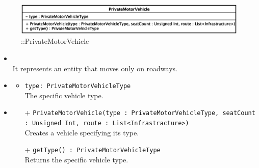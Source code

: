 \begin{figure}[h]
\centering
\includegraphics[scale=0.6,keepaspectratio]{images/solution/app/backend/private_motor_vehicle.eps}
\caption{\pActive::PrivateMotorVehicle}
\label{fig:sd-app-private-motor-vehicle}
\end{figure}
\FloatBarrier
\begin{itemize}
  \item \textbf{\descr} \\
It represents an entity that moves only on roadways.
  \item \textbf{\attrs}
  \begin{itemize}
    \item \texttt{type: PrivateMotorVehicleType} \\
    The specific vehicle type.
  \end{itemize}
  \item \textbf{\ops}
  \begin{itemize}
  \item[+] \texttt{PrivateMotorVehicle(type : PrivateMotorVehicleType, seatCount : Unsigned Int, route : List<Infrastracture>)} \\
Creates a vehicle specifying its type.
    \item[+] \texttt{getType() : PrivateMotorVehicleType} \\
Returns the specific vehicle type.
  \end{itemize}
\end{itemize} 
